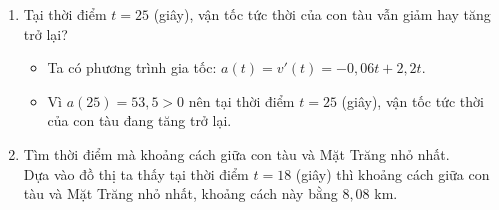 \begin{bt}
{\begin{enumerate}
\begin{itemize}
			\end{itemize}
			\item Tại thời điểm $t=25$ (giây), vận tốc tức thời của con tàu vẫn giảm hay tăng trở lại?
			\begin{itemize}
				\item Ta có phương trình gia tốc: $a(t)=v'(t)=-0{,}06t+2{,}2t$.
				\item Vì $a(25)=53{,}5>0$ nên tại thời điểm $t=25$ (giây), vận tốc tức thời của con tàu đang tăng trở lại.
			\end{itemize}
			\item Tìm thời điểm mà khoảng cách giữa con tàu và Mặt Trăng nhỏ nhất.\\
			Dựa vào đồ thị ta thấy tại thời điểm $t=18$ (giây) thì khoảng cách giữa con tàu và Mặt Trăng nhỏ nhất, khoảng cách này bằng $8{,}08$ km.
		\end{enumerate}
	}
\end{bt}

